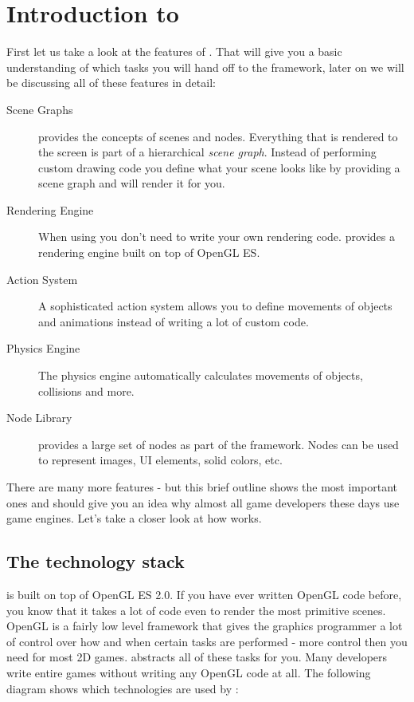 \section{Introduction to \cocos{}}
First let us take a look at the features of \cocos{}. That will give you a basic
understanding of which tasks you will hand off to the framework, later on we
will be discussing all of these features in detail:
\begin{description}
  \item[Scene Graphs] \cocos{} provides the concepts of scenes and nodes.
  Everything that is rendered to the screen is part of a hierarchical
  \textit{scene graph}. Instead of performing custom drawing code you define
  what your scene looks like by providing a scene graph and \cocos{} will render
  it for you.
  \item[Rendering Engine] When using \cocos{} you don't need to write your own
  rendering code. \cocos{} provides a rendering engine built on top of OpenGL
  ES.
  \item[Action System] A sophisticated action system allows you to define
  movements of objects and animations instead of writing a lot of custom code.
  \item[Physics Engine] The \cocos{} physics engine automatically
  calculates movements of objects, collisions and more.
  \item[Node Library] \cocos{} provides a large set of nodes as part of the
  framework. Nodes can be used to represent images, UI elements, solid colors,
  etc.
\end{description}

There are many more features - but this brief outline shows the most
important ones and should give you an idea why almost all game developers these
days use game engines.  Let's take a closer look at how \cocos{} works.

\subsection{The \cocos{} technology stack}

\cocos{} is built on top of OpenGL ES 2.0. If you have ever written OpenGL code
before, you know that it takes a lot of code even to render the most primitive
scenes.	OpenGL is a fairly low level framework that gives the graphics
programmer a lot of control over how and when certain tasks are performed -
more control then you need for most 2D games. \cocos{} abstracts all of these
tasks for you. Many \cocos{} developers write entire games without writing any
OpenGL code at all. The following diagram shows which technologies are used by
\cocos{}:

